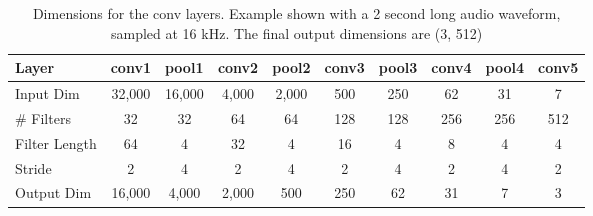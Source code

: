 \documentclass[letterpaper]{article} %
\begin{document}
\begin{table}[!t]
\centering
\caption{Dimensions for the conv layers. Example shown with a 2 second long audio waveform, sampled at 16 kHz. The final output dimensions are (3, 512)}
\label{table:convdims}
\begin{tabular}{l|c|c|c|c|c|c|c|c|c}
Layer         & \multicolumn{1}{l|}{conv1} & \multicolumn{1}{l|}{pool1} & \multicolumn{1}{l|}{conv2} & \multicolumn{1}{l|}{pool2} & \multicolumn{1}{l|}{conv3} & \multicolumn{1}{l|}{pool3} & \multicolumn{1}{l|}{conv4} & \multicolumn{1}{l|}{pool4} & \multicolumn{1}{l}{conv5} \\ \hline
Input Dim     & 32,000                      & 16,000                      & 4,000                       & 2,000                       & 500                        & 250                        & 62                         & 31                         & 7                         \\
\# Filters    & 32                         & 32                         & 64                         & 64                         & 128                        & 128                        & 256                        & 256                        & 512                       \\
Filter Length & 64                         & 4                          & 32                         & 4                          & 16                         & 4                          & 8                          & 4                          & 4                         \\
Stride        & 2                          & 4                          & 2                          & 4                          & 2                          & 4                          & 2                          & 4                          & 2                         \\
Output Dim    & 16,000                      & 4,000                       & 2,000                       & 500                        & 250                        & 62                         & 31                         & 7                          & 3                        
\end{tabular}
\end{table}
\end{document}
